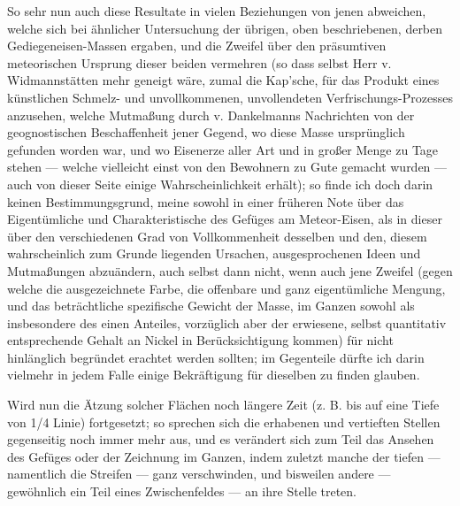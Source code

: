 \documentclass[a4paper, 11pt, oneside, german]{article}
\begin{document}
So sehr nun auch diese Resultate in vielen Beziehungen von jenen abweichen, welche sich bei ähnlicher Untersuchung der übrigen, oben beschriebenen, derben Gediegeneisen-Massen ergaben, und die Zweifel über den präsumtiven meteorischen Ursprung dieser beiden vermehren (so dass selbst Herr v. Widmannstätten mehr geneigt wäre, zumal die Kap'sche, für das Produkt eines künstlichen Schmelz- und unvollkommenen, unvollendeten Verfrischungs-Prozesses anzusehen, welche Mutmaßung durch v. Dankelmanns Nachrichten von der geognostischen Beschaffenheit jener Gegend, wo diese Masse ursprünglich gefunden worden war, und wo Eisenerze aller Art und in großer Menge zu Tage stehen --- welche vielleicht einst von den Bewohnern zu Gute gemacht wurden --- auch von dieser Seite einige Wahrscheinlichkeit erhält); so finde ich doch darin keinen Bestimmungsgrund, meine sowohl in einer früheren Note über das Eigentümliche und Charakteristische des Gefüges am Meteor-Eisen, als in dieser über den verschiedenen Grad von Vollkommenheit desselben und den, diesem wahrscheinlich zum Grunde liegenden Ursachen, ausgesprochenen Ideen und Mutmaßungen abzuändern, auch selbst dann nicht, wenn auch jene Zweifel (gegen welche die ausgezeichnete Farbe, die offenbare und ganz eigentümliche Mengung, und das beträchtliche spezifische Gewicht der Masse, im Ganzen sowohl als insbesondere des einen Anteiles, vorzüglich aber der erwiesene, selbst quantitativ entsprechende Gehalt an Nickel in Berücksichtigung kommen) für nicht hinlänglich begründet erachtet werden sollten; im Gegenteile dürfte ich darin vielmehr in jedem Falle einige Bekräftigung für dieselben zu finden glauben.

Wird nun die Ätzung solcher Flächen noch längere Zeit (z. B. bis auf eine Tiefe von 1/4 Linie) fortgesetzt; so sprechen sich die erhabenen und vertieften Stellen gegenseitig noch immer mehr aus, und es verändert sich zum Teil das Ansehen des Gefüges oder der Zeichnung im Ganzen, indem zuletzt manche der tiefen --- namentlich die Streifen --- ganz verschwinden, und bisweilen andere --- gewöhnlich ein Teil eines Zwischenfeldes --- an ihre Stelle treten.
\end{document}
